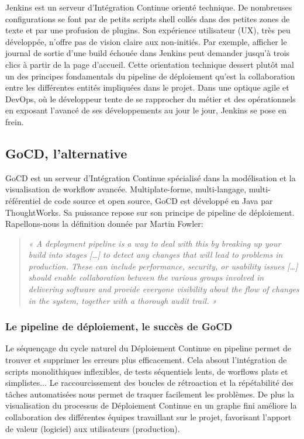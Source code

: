     Jenkins est un serveur d’Intégration Continue orienté technique. De nombreuses configurations se font par de petits scripts shell collés dans des petites zones de texte et par une profusion de plugins. Son expérience utilisateur (UX), très peu développée, n’offre pas de vision claire aux non-initiés. Par exemple, afficher le journal de sortie d’une build échouée dans Jenkins peut demander jusqu’à trois clics à partir de la page d’accueil. Cette orientation technique dessert plutôt mal un des principes fondamentals du pipeline de déploiement qu’est la collaboration entre les différentes entités impliquées dans le projet. Dans une optique agile et DevOps, où le développeur tente de se rapprocher du métier et des opérationnels en exposant l’avancé de ses développements au jour le jour, Jenkins se pose en frein.\\

    \subsection{GoCD, l'alternative}
    GoCD est un serveur d'Intégration Continue spécialisé dans la modélisation et la visualisation de workflow avancée. Multiplate-forme, multi-langage, multi-référentiel de code source et open source, GoCD est développé en Java par ThoughtWorks. Sa puissance repose sur son principe de pipeline de déploiement. Rapellons-nous la définition donnée par Martin Fowler:\\

    \begin{quotation}
      \emph{« A deployment pipeline is a way to deal with this by breaking up your build into stages […] to detect any changes that will lead to problems in production. These can include performance, security, or usability issues […] should enable collaboration between the various groups involved in delivering software and provide everyone visibility about the flow of changes in the system, together with a thorough audit trail. »}
    \end{quotation}

    \subsubsection{Le pipeline de déploiement, le succès de GoCD}
    Le séquençage du cycle naturel du Déploiement Continue en pipeline permet de trouver et supprimer les erreurs plus efficacement. Cela absout l'intégration de scripts monolithiques inflexibles, de tests séquentiels lents, de worflows plats et simplistes... Le raccourcissement des boucles de rétroaction et la répétabilité des tâches automatisées nous permet de traquer facilement les problèmes. De plus la visualisation du processus de Déploiement Continue en un graphe fini améliore la collaboration des différentes équipes travaillant sur le projet, favorisant l'apport de valeur (logiciel) aux utilisateurs (production).\\

